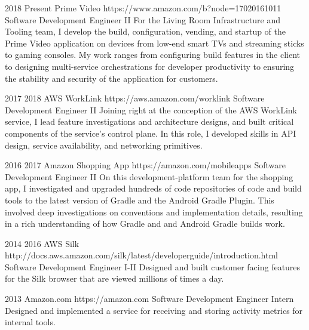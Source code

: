 \job
{2018} {Present}
{Prime Video} {https://www.amazon.com/b?node=17020161011}
{Software Development Engineer II}
{
    For the Living Room Infrastructure and Tooling team, I develop the build, configuration, vending, and startup of the Prime Video application on devices from low-end smart TVs and streaming sticks to gaming consoles. My work ranges from configuring build features in the client to designing multi-service orchestrations for developer productivity to ensuring the stability and security of the application for customers.
}

\job
{2017} {2018}
{AWS WorkLink} {https://aws.amazon.com/worklink}
{Software Development Engineer II}
{
    Joining right at the conception of the AWS WorkLink service, I lead feature investigations and architecture designs, and built critical components of the service's control plane. In this role, I developed skills in API design, service availability, and networking primitives.
}

\job
{2016} {2017}
{Amazon Shopping App} {https://amazon.com/mobileapps}
{Software Development Engineer II}
{
    On this development-platform team for the shopping app, I investigated and upgraded hundreds of code repositories of code and build tools to the latest version of  {Gradle} and the  {Android Gradle Plugin}. This involved deep investigations on conventions and implementation details, resulting in a rich understanding of how Gradle and and Android Gradle builds work.
}

\job
{2014} {2016}
{AWS Silk} {http://docs.aws.amazon.com/silk/latest/developerguide/introduction.html}
{Software Development Engineer I-II}
{
    Designed and built customer facing features for the Silk browser that are viewed millions of times a day.
}

\job
{2013} {}
{Amazon.com} {https://amazon.com}
{Software Development Engineer Intern}
{
    Designed and implemented a service for receiving and storing activity metrics for internal tools.
}